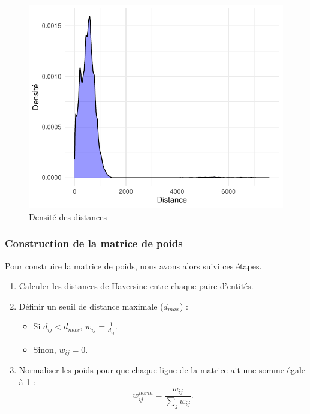 \documentclass[
]{article}
\providecommand{\tightlist}{%
  \setlength{\itemsep}{0pt}\setlength{\parskip}{0pt}}
\begin{document}
\begin{figure}

{\centering \includegraphics{rapport_intermediaire_files/figure-latex/unnamed-chunk-28-1} 

}

\caption{Densité des distances}\label{fig:unnamed-chunk-28}
\end{figure}

\subsubsection{Construction de la matrice de
poids}\label{construction-de-la-matrice-de-poids}

\hfill\break
Pour construire la matrice de poids, nous avons alors suivi ces
étapes.\\

\begin{enumerate}
\def\labelenumi{\arabic{enumi}.}
\tightlist
\item
  Calculer les distances de Haversine entre chaque paire d'entités.
\item
  Définir un seuil de distance maximale (\(d_{max}\)) :

  \begin{itemize}
  \tightlist
  \item
    Si \(d_{ij} < d_{max}\), \(w_{ij} = \frac{1}{d_{ij}}\).
  \item
    Sinon, \(w_{ij} = 0\).
  \end{itemize}
\item
  Normaliser les poids pour que chaque ligne de la matrice ait une somme
  égale à 1 : \[
   w_{ij}^{norm} = \frac{w_{ij}}{\sum_{j} w_{ij}}.
  \]
\end{enumerate}
\end{document}
